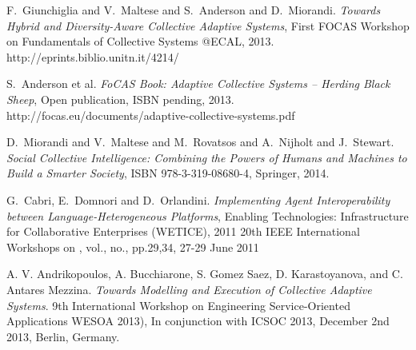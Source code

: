 \documentclass{llncs}
\begin{document}
%
%
%
\begin{thebibliography}{1}


F.~Giunchiglia and V.~Maltese and S.~Anderson and D.~Miorandi. \emph{Towards Hybrid and Diversity-Aware Collective Adaptive Systems}, First FOCAS Workshop on Fundamentals of Collective Systems @ECAL, 2013. http://eprints.biblio.unitn.it/4214/

S.~Anderson et al. \emph{FoCAS Book: Adaptive Collective Systems – Herding Black Sheep}, Open publication, ISBN pending, 2013. http://focas.eu/documents/adaptive-collective-systems.pdf

D.~Miorandi and V.~Maltese and M.~Rovatsos and A.~Nijholt and J.~Stewart. \emph{Social Collective Intelligence: Combining the Powers of Humans and Machines to Build a Smarter Society}, ISBN 978-3-319-08680-4, Springer, 2014.





G.~Cabri, E.~Domnori and D.~Orlandini. \emph{Implementing Agent Interoperability between Language-Heterogeneous Platforms}, Enabling Technologies: Infrastructure for Collaborative Enterprises (WETICE), 2011 20th IEEE International Workshops on , vol., no., pp.29,34, 27-29 June 2011



A. V. Andrikopoulos, A. Bucchiarone, S. Gomez Saez, D. Karastoyanova, and C. Antares Mezzina. \emph{Towards Modelling and Execution of Collective Adaptive Systems}. 9th International Workshop on Engineering Service-Oriented Applications WESOA 2013), In conjunction with ICSOC 2013, December 2nd 2013, Berlin, Germany.


\end{thebibliography}
\end{document}
